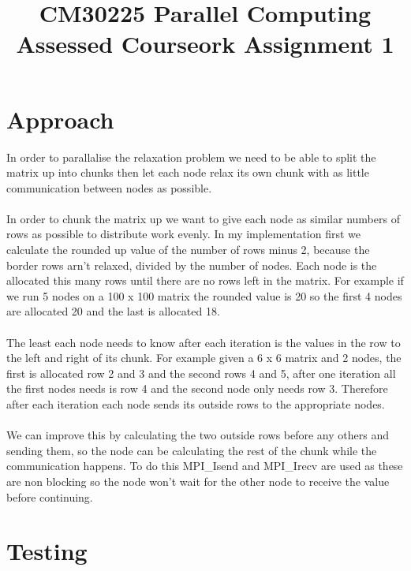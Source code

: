 \documentclass{article}
\begin{document}
\title{CM30225 Parallel Computing \\ Assessed Courseork Assignment 1}
\author{}

\maketitle

\section{Approach}

In order to parallalise the relaxation problem we need to be able to split the matrix
up into chunks then let each node relax its own chunk with as little communication
between nodes as possible.\\~\\
In order to chunk the matrix up we want to give each node as similar numbers of
rows as possible to distribute work evenly. In my implementation first we calculate
the rounded up value of the number of rows minus 2, because the border rows arn't relaxed,
divided by the number of nodes. Each node is the allocated this many rows until
there are no rows left in the matrix. For example if we run 5 nodes on a 100 x 100 matrix
the rounded value is 20 so the first 4 nodes are allocated 20 and the last is allocated
18.\\~\\
The least each node needs to know after each iteration is the values in the row
to the left and right of its chunk. For example given a 6 x 6 matrix and 2 nodes,
the first is allocated row 2 and 3 and the second rows 4 and 5, after one iteration
all the first nodes needs is row 4 and the second node only needs row 3. Therefore
after each iteration each node sends its outside rows to the appropriate nodes.\\~\\
We can improve this by calculating the two outside rows before any others and sending
them, so the node can be calculating the rest of the chunk while the communication
happens. To do this MPI\_Isend and MPI\_Irecv are used as these are non blocking
so the node won't wait for the other node to receive the value before continuing.

\section{Testing}
\end{document}
